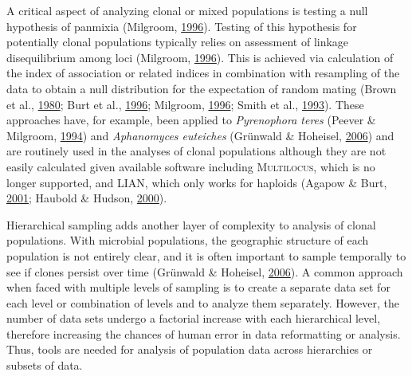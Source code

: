 \documentclass[double,11pt]{beavtex}
\begin{document}
  A critical aspect of analyzing clonal or mixed populations is testing a
  null hypothesis of panmixia (Milgroom,
  \protect\hyperlink{ref-milgroom1996recombination}{1996}). Testing of
  this hypothesis for potentially clonal populations typically relies on
  assessment of linkage disequilibrium among loci (Milgroom,
  \protect\hyperlink{ref-milgroom1996recombination}{1996}). This is
  achieved via calculation of the index of association or related indices
  in combination with resampling of the data to obtain a null distribution
  for the expectation of random mating (Brown et al.,
  \protect\hyperlink{ref-brown1980multilocus}{1980}; Burt et al.,
  \protect\hyperlink{ref-burt1996molecular}{1996}; Milgroom,
  \protect\hyperlink{ref-milgroom1996recombination}{1996}; Smith et al.,
  \protect\hyperlink{ref-smith1993how}{1993}). These approaches have, for
  example, been applied to \emph{Pyrenophora teres} (Peever \& Milgroom,
  \protect\hyperlink{ref-peever1994genetic}{1994}) and \emph{Aphanomyces
  euteiches} (Grünwald \& Hoheisel,
  \protect\hyperlink{ref-grunwald2006hierarchical}{2006}) and are
  routinely used in the analyses of clonal populations although they are
  not easily calculated given available software including
  \textsc{Multilocus}, which is no longer supported, and \textsc{LIAN},
  which only works for haploids (Agapow \& Burt,
  \protect\hyperlink{ref-Agapow_2001}{2001}; Haubold \& Hudson,
  \protect\hyperlink{ref-Haubold:2000}{2000}).
  
  Hierarchical sampling adds another layer of complexity to analysis of
  clonal populations. With microbial populations, the geographic structure
  of each population is not entirely clear, and it is often important to
  sample temporally to see if clones persist over time (Grünwald \&
  Hoheisel, \protect\hyperlink{ref-grunwald2006hierarchical}{2006}). A
  common approach when faced with multiple levels of sampling is to create
  a separate data set for each level or combination of levels and to
  analyze them separately. However, the number of data sets undergo a
  factorial increase with each hierarchical level, therefore increasing
  the chances of human error in data reformatting or analysis. Thus, tools
  are needed for analysis of population data across hierarchies or subsets
  of data.
  
\end{document}
